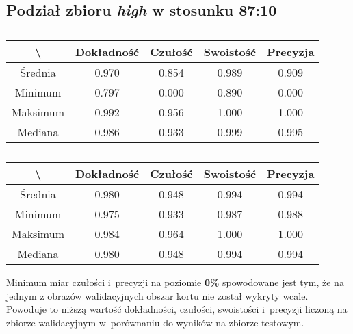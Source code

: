 \subsection{Podział zbioru \textit{high} w stosunku 87:10}
\label{sec:highsplitb}


\begin{table}[H]
	\centering
	\caption{}
	\vspace{6pt}
	{\footnotesize
		\begin{tabular}{|c|c|c|c|c|}
      \hline \textbackslash & Dokładność & Czułość & Swoistość & Precyzja \\
      \hline Średnia & 0.970 & 0.854 & 0.989 & 0.909 \\
      \hline Minimum & 0.797 & 0.000 & 0.890 & 0.000 \\
      \hline Maksimum & 0.992 & 0.956 & 1.000 & 1.000 \\
      \hline Mediana & 0.986 & 0.933 & 0.999 & 0.995 \\
      \hline
    \end{tabular}
    \label{Tab:highsplitb_val}
	}
	\vspace{0pt}
\end{table}

\begin{table}[H]
	\centering
	\caption{}
	\vspace{6pt}
	{\footnotesize
		\begin{tabular}{|c|c|c|c|c|}
      \hline \textbackslash & Dokładność & Czułość & Swoistość & Precyzja \\
      \hline Średnia & 0.980 & 0.948 & 0.994 & 0.994 \\
      \hline Minimum & 0.975 & 0.933 & 0.987 & 0.988 \\
      \hline Maksimum & 0.984 & 0.964 & 1.000 & 1.000 \\
      \hline Mediana & 0.980 & 0.948 & 0.994 & 0.994 \\
      \hline
    \end{tabular}
    \label{Tab:highsplitb_test}
	}
	\vspace{0pt}
\end{table}

Minimum miar czułości i~precyzji na poziomie \textbf{0\%} spowodowane jest tym, że na jednym z obrazów walidacyjnych obszar kortu nie został wykryty wcale. Powoduje to niższą wartość dokładności, czułości, swoistości i~precyzji liczoną na zbiorze walidacyjnym w~porównaniu do wyników na zbiorze testowym.
